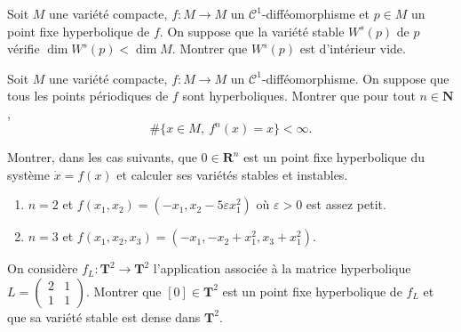 \documentclass[a4paper,10pt,openany]{article}
\theoremstyle{plain}
\theoremstyle{definition}
\newcommand{\T}{\mathbf{T}}
\newcommand{\R}{\mathbf{R}}
\newcommand{\N}{\mathbf{N}}
\begin{document}
\noindent Soit $M$ une vari\'et\'e compacte, $f : M \to M$ un $\mathcal{C}^1$-diff\'eomorphisme et $p \in M$ un point fixe hyperbolique de $f$. On suppose que la vari\'et\'e stable $W^s(p)$ de $p$ v\'erifie $\dim W^s(p) < \dim M$. Montrer que $W^s(p)$ est d'int\'erieur vide.

\vspace{0.6cm}


 \vspace{1.5mm} 

\noindent Soit $M$ une vari\'et\'e compacte, $f : M \to M$ un $\mathcal{C}^1$-diff\'eomorphisme. On suppose que tous les points p\'eriodiques de $f$ sont hyperboliques. Montrer que pour tout $n \in \N$, 
$$
\# \{x \in M,~f^n(x) = x\} < \infty.
$$
\vspace{0.6cm}



 \vspace{1.5mm} 

\noindent Montrer, dans les cas suivants, que $0 \in \R^n$ est un point fixe hyperbolique du syst\`eme $\dot{x} = f(x)$ et calculer ses vari\'et\'es stables et instables.
\begin{enumerate}
\item $n=2$ et $f(x_1, x_2) = (-x_1, x_2 - 5 \varepsilon x_1^2)$ o\`u $\varepsilon > 0$ est assez petit.
\item $n=3$ et $f(x_1, x_2, x_3) = (-x_1, -x_2 + x_1^2, x_3 + x_1^2)$.
\end{enumerate}


\vspace{0.6cm}

 \vspace{1.5mm} 

\noindent On consid\`ere $f_L : \T^2 \to \T^2$ l'application associ\'ee \`a la matrice hyperbolique
$
L =
\begin{pmatrix}
2 & 1 \\ 1 & 1
\end{pmatrix}.
$
Montrer que $[0] \in \T^2$ est un point fixe hyperbolique de $f_L$ et que sa vari\'et\'e stable est dense dans $\T^2$.
\end{document}
